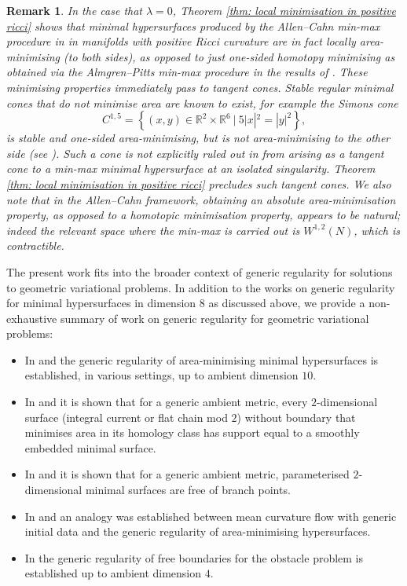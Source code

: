 \documentclass[11pt]{article}
\newtheorem{rem}{Remark}
\begin{document}
\begin{rem}\label{rem: CLS comparison}
In the case that $\lambda = 0$, Theorem \ref{thm: local minimisation in positive ricci} shows that minimal hypersurfaces produced by the Allen--Cahn min-max procedure in \cite{guaraco} in manifolds with positive Ricci curvature are in fact locally area-minimising (to both sides), as opposed to just one-sided homotopy minimising as obtained via the Almgren--Pitts min-max procedure in the results of \cite{C-L-S}. These minimising properties immediately pass to tangent cones. Stable regular minimal cones that do not minimise area are known to exist, for example the Simons cone
    \begin{equation*}
        C^{1,5} = \left\{(x,y) \in \mathbb{R}^2 \times \mathbb{R}^6 \: | \: 5|x|^2 = |y|^2 \right\},
    \end{equation*}
is stable and one-sided area-minimising, but is not area-minimising to the other side (see \cite{Lawlor91}). Such a cone is not explicitly ruled out in \cite{C-L-S} from arising as a tangent cone to a min-max minimal hypersurface at an isolated singularity. Theorem \ref{thm: local minimisation in positive ricci} precludes such tangent cones. We also note that in the Allen--Cahn framework, obtaining an absolute area-minimisation property, as opposed to a homotopic minimisation property, appears to be natural; indeed the relevant space where the min-max is carried out is $W^{1,2}(N)$, which is contractible.
\end{rem}

The present work fits into the broader context of generic regularity for solutions to geometric variational problems. In addition to the works on generic regularity for minimal hypersurfaces in dimension $8$ as discussed above, we provide a non-exhaustive summary of work on generic regularity for geometric variational problems:
\begin{itemize}
    \item In \cite{C-M-S} and \cite{C-M-S-2} the generic regularity of area-minimising minimal hypersurfaces is established, in various settings, up to ambient dimension $10$.

    \item In \cite{White1985} and \cite{White2019} it is shown that for a generic ambient metric, every $2$-dimensional surface (integral current or flat chain mod $2$) without boundary that minimises area in its homology class has support equal to a smoothly embedded minimal surface.

    \item In \cite{Moore2006} and \cite{Moore2017} it is shown that for a generic ambient metric, parameterised $2$-dimensional minimal surfaces are free of branch points.

    \item In \cite{CCMS2020} and \cite{CCMS2022} an analogy was established between mean
    curvature flow with generic initial data and the generic regularity of area-minimising hypersurfaces.

    \item In \cite{F-R-S} the generic regularity of free boundaries for the obstacle problem is established up to ambient dimension $4$.
\end{itemize}
\end{document}
